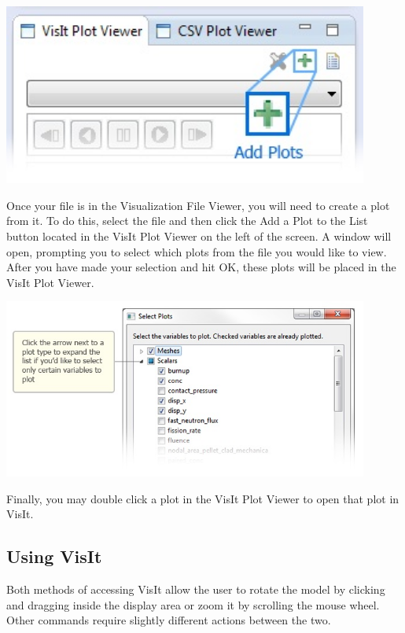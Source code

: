 \documentclass{article}
\begin{document}
\begin{center}
\includegraphics[width=12cm]{images/VisualizationAddPlots}
\end{center}

Once your file is in the Visualization File Viewer, you will need to create a
plot from it. To do this, select the file and then click the Add a Plot to the
List button located in the VisIt Plot Viewer on the left of the screen. A window
will open, prompting you to select which plots from the file you would like
to view. After you have made your selection and hit OK, these plots will be
placed in the VisIt Plot Viewer.

\begin{center}
\includegraphics[width=12cm]{images/VisualizationSelectPlots}
\end{center}

Finally, you may double click a plot in the VisIt Plot Viewer to open that plot
in VisIt. 

\subsection{Using VisIt}

Both methods of accessing VisIt allow the user to rotate the model by clicking
and dragging inside the display area or zoom it by scrolling the mouse wheel.
Other commands require slightly different actions between the two. 
\end{document}
